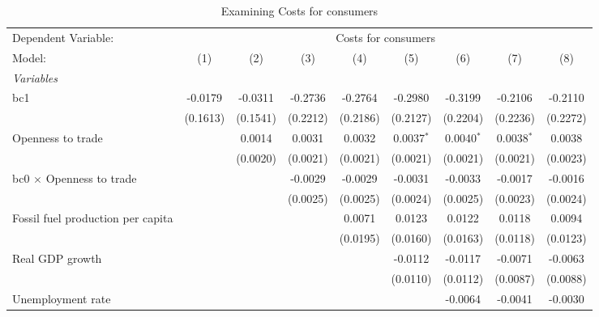 
\begin{table}[htbp]
   \caption{Examining Costs for consumers}
   \centering
   \begin{tabular}{lcccccccc}
      \tabularnewline \midrule \midrule
      Dependent Variable: & \multicolumn{8}{c}{Costs for consumers}\\
      Model:                                  & (1)      & (2)      & (3)      & (4)      & (5)          & (6)          & (7)          & (8)\\  
      \midrule
      \emph{Variables}\\
      bc1                                     & -0.0179  & -0.0311  & -0.2736  & -0.2764  & -0.2980      & -0.3199      & -0.2106      & -0.2110\\   
                                              & (0.1613) & (0.1541) & (0.2212) & (0.2186) & (0.2127)     & (0.2204)     & (0.2236)     & (0.2272)\\   
      Openness to trade                       &          & 0.0014   & 0.0031   & 0.0032   & 0.0037$^{*}$ & 0.0040$^{*}$ & 0.0038$^{*}$ & 0.0038\\   
                                              &          & (0.0020) & (0.0021) & (0.0021) & (0.0021)     & (0.0021)     & (0.0021)     & (0.0023)\\   
      bc0 $\times$ Openness to trade          &          &          & -0.0029  & -0.0029  & -0.0031      & -0.0033      & -0.0017      & -0.0016\\   
                                              &          &          & (0.0025) & (0.0025) & (0.0024)     & (0.0025)     & (0.0023)     & (0.0024)\\   
      Fossil fuel production per capita       &          &          &          & 0.0071   & 0.0123       & 0.0122       & 0.0118       & 0.0094\\   
                                              &          &          &          & (0.0195) & (0.0160)     & (0.0163)     & (0.0118)     & (0.0123)\\   
      Real GDP growth                         &          &          &          &          & -0.0112      & -0.0117      & -0.0071      & -0.0063\\   
                                              &          &          &          &          & (0.0110)     & (0.0112)     & (0.0087)     & (0.0088)\\   
      Unemployment rate                       &          &          &          &          &              & -0.0064      & -0.0041      & -0.0030\\   

\end{tabular}
\end{table}
